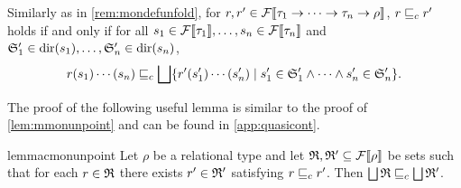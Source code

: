 \documentclass[a4paper,twoside,notitlepage,openright,11pt]{report}
\begin{document}
\begin{remark}
  Similarly as in \cref{rem:mondefunfold}, for $r,r'\in{\mathcal F}\llbracket\tau_1\to\cdots\to\tau_n\to\rho\rrbracket$, $r\sqsubseteq_c r'$ holds if and only if for all $s_1\in{\mathcal F}\llbracket\tau_1\rrbracket,\ldots,s_n\in{\mathcal F}\llbracket\tau_n\rrbracket$ and $\mathfrak S'_1\in\operatorname{dir}(s_1),\ldots,\mathfrak S'_n\in\operatorname{dir}(s_n)$,
  \begin{align*}
    r(s_1)\cdots(s_n)\sqsubseteq_c\bigsqcup\{r'(s'_1)\cdots(s'_n)\mid s'_1\in\mathfrak S'_1\land\cdots\land s'_n\in\mathfrak S'_n\}.
  \end{align*}
\end{remark}

The proof of the following useful lemma is similar to the proof of \cref{lem:mmonunpoint} and can be found in \cref{app:quasicont}.
\begin{restatable}{lemma}{cmonunpoint}
  \label{lem:cmonunpoint}
  Let $\rho$ be a relational type and let $\mathfrak R,\mathfrak R'\subseteq{\mathcal F}\llbracket\rho\rrbracket$ be sets such that for each $r\in\mathfrak R$ there exists $r'\in\mathfrak R'$ satisfying $r\sqsubseteq_c r'$. Then $\bigsqcup\mathfrak R\sqsubseteq_c\bigsqcup\mathfrak R'$.
\end{restatable}
\end{document}

